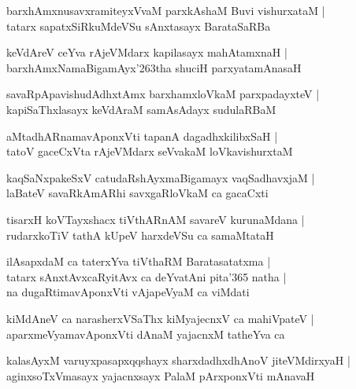 \documentclass[twoside,12pt,openright]{book}
\def\S{\char'263}
\newcounter{shloka}[chapter]
\begin{document}
\begin{shloka}
barxhAmxnusavxramiteyxVvaM parxkAshaM Buvi vishurxataM |\\
tatarx sapatxSiRkuMdeVSu sAnxtasayx BarataSaRBa
\end{shloka}

\begin{shloka}
keVdAreV ceYva rAjeVMdarx kapilasayx mahAtamxnaH |\\
barxhAmxNamaBigamAyx\S tha shuciH parxyatamAnasaH 
\end{shloka}

\begin{shloka}
savaRpApavishudAdhxtAmx barxhamxloVkaM parxpadayxteV |\\
kapiSaThxlasayx keVdAraM samAsAdayx sudulaRBaM 
\end{shloka}

\begin{shloka}
aMtadhARnamavAponxVti tapanA dagadhxkilibxSaH |\\
tatoV gaceCxVta rAjeVMdarx seVvakaM loVkavishurxtaM 
\end{shloka}

\begin{shloka}
kaqSaNxpakeSxV catudaRshAyxmaBigamayx vaqSadhavxjaM |\\
laBateV savaRkAmARhi savxgaRloVkaM ca gacaCxti 
\end{shloka}

\begin{shloka}
tisarxH koVTayxshacx tiVthARnAM  savareV kurunaMdana |\\
rudarxkoTiV tathA kUpeV harxdeVSu ca samaMtataH 
\end{shloka}

\begin{shloka}
ilAsapxdaM ca taterxYva tiVthaRM Baratasatatxma |\\
tatarx sAnxtAvxcaRyitAvx ca deYvatAni pita\char'365 natha |\\
na dugaRtimavAponxVti vAjapeVyaM ca viMdati 
\end{shloka}

\begin{shloka}
kiMdAneV ca narasherxVSaThx kiMyajecnxV ca mahiVpateV |\\
aparxmeVyamavAponxVti dAnaM yajacnxM tatheYva ca 
\end{shloka}

\begin{shloka}
kalasAyxM varuyxpasapxqqshayx sharxdadhxdhAnoV jiteVMdirxyaH |\\
aginxsoTxVmasayx yajacnxsayx PalaM pArxponxVti mAnavaH 
\end{shloka}
\end{document}
